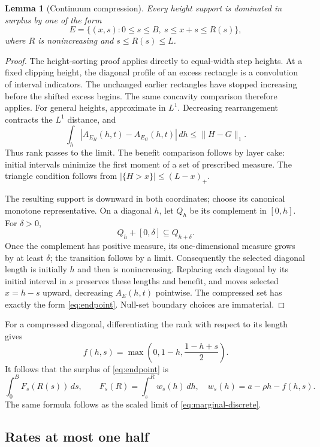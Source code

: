\documentclass[11pt]{article}
\newtheorem{lemma}[theorem]{Lemma}
\theoremstyle{remark}\newtheorem{remark}[theorem]{Remark}
\newcommand{\dd}{\,d}
\begin{document}
\begin{lemma}[Continuum compression]\label{lem:continuum-compression}
Every height support is dominated in surplus by one of the form
\begin{equation}\label{eq:endpoint}
 E=\{(x,s):0\le s\le B,\ s\le x+s\le R(s)\},
\end{equation}
where $R$ is nonincreasing and $s\le R(s)\le L$.
\end{lemma}
\begin{proof}
The height-sorting proof applies directly to equal-width step heights. At a fixed clipping height, the diagonal profile of an excess rectangle is a convolution of interval indicators. The unchanged earlier rectangles have stopped increasing before the shifted excess begins. The same concavity comparison therefore applies. For general heights, approximate in $L^1$. Decreasing rearrangement contracts the $L^1$ distance, and
\[
 \int_h|A_{E_H}(h,t)-A_{E_G}(h,t)|\dd h\le\|H-G\|_1.
\]
Thus rank passes to the limit. The benefit comparison follows by layer cake: initial intervals minimize the first moment of a set of prescribed measure. The triangle condition follows from $|\{H>x\}|\le(L-x)_+$.

The resulting support is downward in both coordinates; choose its canonical monotone representative. On a diagonal $h$, let $Q_h$ be its complement in $[0,h]$. For $\delta>0$,
\[
 Q_h+[0,\delta]\subseteq Q_{h+\delta}.
\]
Once the complement has positive measure, its one-dimensional measure grows by at least $\delta$; the transition follows by a limit. Consequently the selected diagonal length is initially $h$ and then is nonincreasing. Replacing each diagonal by its initial interval in $s$ preserves these lengths and benefit, and moves selected $x=h-s$ upward, decreasing $A_E(h,t)$ pointwise. The compressed set has exactly the form \eqref{eq:endpoint}. Null-set boundary choices are immaterial.
\end{proof}

For a compressed diagonal, differentiating the rank with respect to its length gives
\[
 f(h,s)=\max\left(0,1-h,\frac{1-h+s}{2}\right).
\]
It follows that the surplus of \eqref{eq:endpoint} is
\begin{equation}\label{eq:column-functional}
 \int_0^B F_s(R(s))\dd s,\qquad
 F_s(R)=\int_s^R w_s(h)\dd h,
 \quad w_s(h)=a-\rho h-f(h,s).
\end{equation}
The same formula follows as the scaled limit of \eqref{eq:marginal-discrete}.

\subsection{Rates at most one half}
\end{document}
